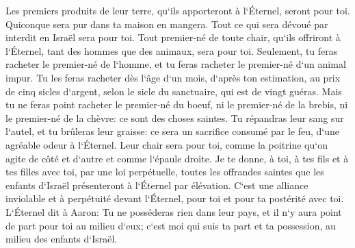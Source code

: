 \verse Les premiers produits de leur terre, qu`ils apporteront à l`Éternel, seront pour toi. Quiconque sera pur dans ta maison en mangera. 
\verse Tout ce qui sera dévoué par interdit en Israël sera pour toi. 
\verse Tout premier-né de toute chair, qu`ils offriront à l`Éternel, tant des hommes que des animaux, sera pour toi. Seulement, tu feras racheter le premier-né de l`homme, et tu feras racheter le premier-né d`un animal impur. 
\verse Tu les feras racheter dès l`âge d`un mois, d`après ton estimation, au prix de cinq sicles d`argent, selon le sicle du sanctuaire, qui est de vingt guéras. 
\verse Mais tu ne feras point racheter le premier-né du boeuf, ni le premier-né de la brebis, ni le premier-né de la chèvre: ce sont des choses saintes. Tu répandras leur sang sur l`autel, et tu brûleras leur graisse: ce sera un sacrifice consumé par le feu, d`une agréable odeur à l`Éternel. 
\verse Leur chair sera pour toi, comme la poitrine qu`on agite de côté et d`autre et comme l`épaule droite. 
\verse Je te donne, à toi, à tes fils et à tes filles avec toi, par une loi perpétuelle, toutes les offrandes saintes que les enfants d`Israël présenteront à l`Éternel par élévation. C`est une alliance inviolable et à perpétuité devant l`Éternel, pour toi et pour ta postérité avec toi. 
\verse L`Éternel dit à Aaron: Tu ne posséderas rien dans leur pays, et il n`y aura point de part pour toi au milieu d`eux; c`est moi qui suis ta part et ta possession, au milieu des enfants d`Israël. 
